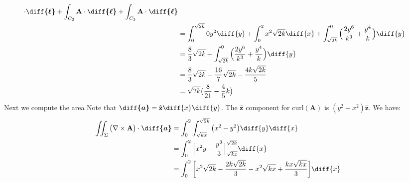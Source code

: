 \begin{solution}
\begin{subequations}
\begin{align}
                            \cdot\boldsymbol{\diff{\ell}}
                        +\int_{C_{2}}\mathbf{A}
                            \cdot\boldsymbol{\diff{\ell}}
                        +\int_{C_{3}}
                            \mathbf{A}\cdot\boldsymbol{\diff{\ell}}\\
                        &=\int_{0}^{\sqrt{2k}}0y^{2}\diff{y}
                         +\int_{0}^{2}x^{2}\sqrt{2k}\diff{x}
                         +\int_{\sqrt{2k}}^{0}\Big(
                            \frac{2y^{6}}{k^{3}}
                            +\frac{y^{4}}{k}
                        \Big)\diff{y}\\
                        &=\frac{8}{3}\sqrt{2k}
                         +\int_{\sqrt{2k}}^{0}\Big(
                             \frac{2y^{6}}{k^{3}}
                            +\frac{y^{4}}{k}
                        \Big)\diff{y}\\
                        &=\frac{8}{3}\sqrt{2k}
                         -\frac{16}{7}\sqrt{2k}
                         -\frac{4k\sqrt{2k}}{5}\\
                        &=\sqrt{2k}\big(\frac{8}{21}-\frac{4}{5}k\big)
                    \end{align}
                \end{subequations}
                Next we compute the area
                Note that
                $\boldsymbol{\diff{a}}%
                 =\hat{\mathbf{z}}\diff{x}\diff{y}$.
                The $\hat{\mathbf{z}}$
                component for $\mathrm{curl}(\mathbf{A})$ is
                $(y^{2}-x^{2})\hat{\mathbf{z}}$. We have:
                \begin{subequations}
                    \begin{align}
                        \iint_{\Sigma}\big(\nabla\times\mathbf{A}\big)
                            \cdot\boldsymbol{\diff{a}}
                        &=\int_{0}^{2}\int_{\sqrt{kx}}^{\sqrt{2k}}
                            \big(x^{2}-y^{2}\big)\diff{y}\diff{x}\\
                        &=\int_{0}^{2}\Big[x^{2}y-\frac{y^{3}}{3}
                            \Big]_{\sqrt{kx}}^{\sqrt{2k}}\diff{x}\\
                        &=\int_{0}^{2}\bigg[
                            x^{2}\sqrt{2k}-\frac{2k\sqrt{2k}}{3}
                            -x^{2}\sqrt{kx}+\frac{kx\sqrt{kx}}{3}
                        \bigg]\diff{x}
                    \end{align}
                \end{subequations}

\end{solution}
